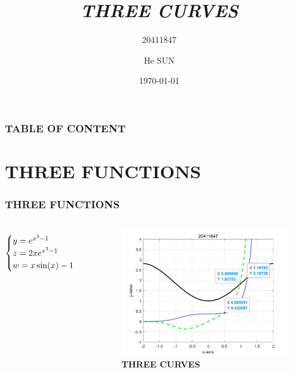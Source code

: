 \documentclass[11pt]{beamer}
\title{\textit{THREE CURVES}}
\subtitle{20411847}
\author{He SUN}
\institute{UNNC}
\date{\today}
\begin{document}
\begin{frame}
\titlepage %
\end{frame}

\begin{frame}\frametitle{TABLE OF CONTENT}
\tableofcontents
\end{frame}

\section{THREE FUNCTIONS}
\begin{frame}\frametitle{THREE FUNCTIONS}
\begin{columns}
\begin{eqnarray*} 
\begin{cases}
y =  e^{x^3-1}\\
z =  2x\*e^{x^3-1}\\
w =  x\*\sin(x)-1
\end{cases}
\end{eqnarray*}
\begin{figure}
\centering
\includegraphics[scale=0.45]{threecurves}
\caption{\textbf{THREE CURVES}}
\end{figure}
\end{columns}
\end{frame}
\end{document}
